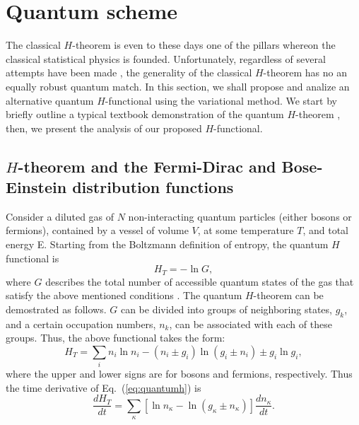\section{Quantum scheme}\label{sec:quantum}

The classical $H$-theorem is even to these days one of the pillars whereon the classical statistical
physics is founded. Unfortunately, regardless of several attempts have been made \cite{bib:silva2010,bib:deroeck2006,bib:grabert1974,bib:han2015,bib:das2018,bib:vonneumann2010}, 
the generality of the classical $H$-theorem has no an equally robust quantum match. In this section, we shall
propose and analize an alternative quantum $H$-functional using the variational method.
We start by briefly outline a typical textbook demonstration of the quantum $H$-theorem
\cite{bib:tolman}, then, we present the analysis of our proposed $H$-functional.

\subsection{$H$-theorem and the Fermi-Dirac and Bose-Einstein distribution functions}

Consider a diluted gas of $N$ non-interacting quantum particles (either bosons or fermions),
contained by a vessel of volume
$V$, at some temperature $T$, and total energy E. Starting from the Boltzmann definition
of entropy, the quantum $H$ functional is
%
\begin{equation}
   H_T=-\ln G,
\end{equation}
%
where $G$ describes the total number of accessible quantum states of the gas that satisfy the
above mentioned conditions \cite{bib:tolman}.
The quantum $H$-theorem can be demostrated as follows.  $G$ can be divided into groups of neighboring states,
$g_k$, and a certain occupation numbers, $n_k$, can be associated with each of these
groups. Thus, the above functional takes the form:
%
\begin{equation}\label{eq:quantumh}
    H_T=\sum_i n_i \ln n_i -(n_i\pm g_i)\ln (g_i \pm n_i)\pm g_i\ln g_i, 
\end{equation}
%
where the upper and lower signs are for bosons and fermions, respectively.
Thus the time derivative of Eq.~(\ref{eq:quantumh}) is
%
\begin{equation}\label{eq:quantumdHdt}
\frac{dH_T}{dt}=\sum_{\kappa}\left[\ln n_{\kappa}-\ln\left(g_{\kappa}\pm n_{\kappa}\right)\right]
\frac{dn_{\kappa}}{dt}.
\end{equation}
%

